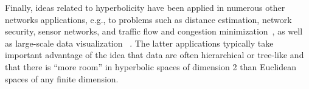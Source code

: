 \documentclass[11pt]{article}
\begin{document}
Finally, ideas related to hyperbolicity have been applied in numerous other 
networks applications, e.g., to problems such as distance estimation, 
network security, sensor networks, and traffic flow and congestion 
minimization~\cite{ST08,JLBB11,JLHB07,JL04,NS11,BT10a_TR}, as well 
as large-scale data visualization
~\cite{Mun98}.
The latter applications typically take important advantage of the idea that 
data are often hierarchical or tree-like and that there is ``more room'' in 
hyperbolic spaces of dimension 2 than Euclidean spaces of any finite dimension.


%
%
%
\end{document}

